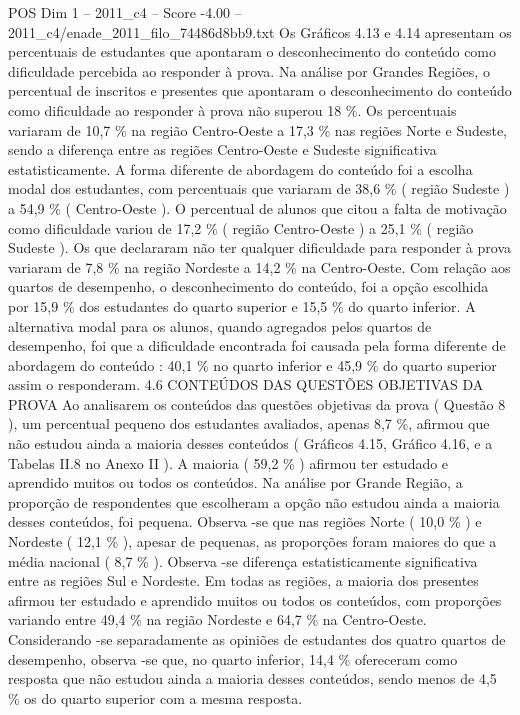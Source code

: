 \begin{textsample}{POS Dim 1 – 2011\_c4 – Score -4.00 – 2011\_c4/enade\_2011\_filo\_74486d8bb9.txt}
Os Gráficos 4.13 e 4.14 apresentam os percentuais de estudantes que apontaram o desconhecimento do conteúdo como dificuldade percebida ao responder à prova.
Na análise por Grandes Regiões, o percentual de inscritos e presentes que apontaram o desconhecimento do conteúdo como dificuldade ao responder à prova não superou 18 \%.
Os percentuais variaram de 10,7 \% na região Centro-Oeste a 17,3 \% nas regiões Norte e Sudeste, sendo a diferença entre as regiões Centro-Oeste e Sudeste significativa estatisticamente.
A forma diferente de abordagem do conteúdo foi a escolha modal dos estudantes, com percentuais que variaram de 38,6 \% ( região Sudeste ) a 54,9 \% ( Centro-Oeste ).
O percentual de alunos que citou a falta de motivação como dificuldade variou de 17,2 \% ( região Centro-Oeste ) a 25,1 \% ( região Sudeste ).
Os que declararam não ter qualquer dificuldade para responder à prova variaram de 7,8 \% na região Nordeste a 14,2 \% na Centro-Oeste.
Com relação aos quartos de desempenho, o desconhecimento do conteúdo, foi a opção escolhida por 15,9 \% dos estudantes do quarto superior e 15,5 \% do quarto inferior.
A alternativa modal para os alunos, quando agregados pelos quartos de desempenho, foi que a dificuldade encontrada foi causada pela forma diferente de abordagem do conteúdo : 40,1 \% no quarto inferior e 45,9 \% do quarto superior assim o responderam. 4.6 CONTEÚDOS DAS QUESTÕES OBJETIVAS DA PROVA Ao analisarem os conteúdos das questões objetivas da prova ( Questão 8 ), um percentual pequeno dos estudantes avaliados, apenas 8,7 \%, afirmou que não estudou ainda a maioria desses conteúdos ( Gráficos 4.15, Gráfico 4.16, e a Tabelas II.8 no Anexo II ).
A maioria ( 59,2 \% ) afirmou ter estudado e aprendido muitos ou todos os conteúdos.
Na análise por Grande Região, a proporção de respondentes que escolheram a opção não estudou ainda a maioria desses conteúdos, foi pequena.
Observa -se que nas regiões Norte ( 10,0 \% ) e Nordeste ( 12,1 \% ), apesar de pequenas, as proporções foram maiores do que a média nacional ( 8,7 \% ).
Observa -se diferença estatisticamente significativa entre as regiões Sul e Nordeste.
Em todas as regiões, a maioria dos presentes afirmou ter estudado e aprendido muitos ou todos os conteúdos, com proporções variando entre 49,4 \% na região Nordeste e 64,7 \% na Centro-Oeste.
Considerando -se separadamente as opiniões de estudantes dos quatro quartos de desempenho, observa -se que, no quarto inferior, 14,4 \% ofereceram como resposta que não estudou ainda a maioria desses conteúdos, sendo menos de 4,5 \% os do quarto superior com a mesma resposta.

\end{textsample}
